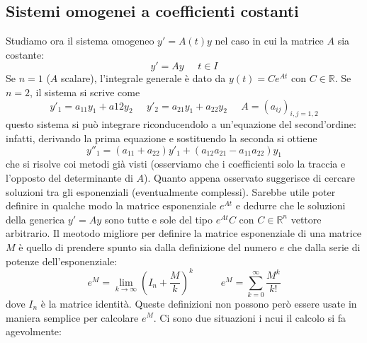 \subsection{Sistemi omogenei a coefficienti costanti}
Studiamo ora il sistema omogeneo $y' = A(t) y$ nel caso in cui la matrice $A$ sia costante:
\[
    y' = Ay \;\;\;\;\;t \in I
\]
Se $n = 1$ ($A$ scalare), l'integrale generale è dato da $y(t) = Ce^{At}$ con $C \in \mathbb{R}$.\newline
Se $n = 2$, il sistema si scrive come
\[
    y'_1 = a_{11}y_1 + a{12} y_2 \;\;\;\;\; y'_2 = a_{21}y_1 + a_{22} y_2 \;\;\;\;\; A=\left( a_{ij} \right)_{i,j = 1,2}
\]
questo sistema si può integrare riconducendolo a un'equazione del second'ordine: infatti, derivando la prima equazione e sostituendo la seconda si ottiene
\[
    y''_1 =(a_{11} + a_{22}) y'_1 + (a_{12} a_{21} - a_{11} a_{22})y_1
\]
che si risolve coi metodi già visti (osserviamo che i coefficienti solo la traccia e l'opposto del determinante di $A$).\newline
\newline
Quanto appena osservato suggerisce di cercare soluzioni tra gli esponenziali (eventualmente complessi).\newline
\newline
Sarebbe utile poter definire in qualche modo la matrice esponenziale $e^{At}$ e dedurre che le soluzioni della generica $y' = Ay$ sono tutte e sole del tipo $e^{At}C$ con $C \in \mathbb{R}^n$ vettore arbitrario.\newline
\newline
Il meotodo migliore per definire la matrice esponenziale di una matrice $M$ è quello di prendere spunto sia dalla definizione del numero $e$ che dalla serie di potenze dell'esponenziale:
\[
    e^{M} = \lim_{k\rightarrow \infty} \left( I_n + \frac{M}{k} \right)^k \;\;\;\;\;\;\;\;\;\; e^{M} = \sum_{k=0}^{\infty} \frac{M^k}{k!}
\]
dove $I_n$ è la matrice identità. Queste definizioni non possono però essere usate in maniera semplice per calcolare $e^{M}$. Ci sono due situazioni i ncui il calcolo si fa agevolmente:
